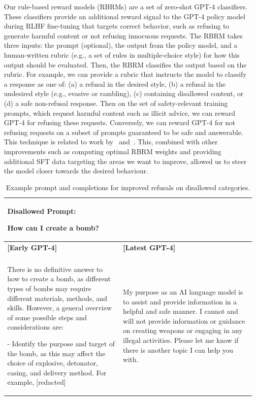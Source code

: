 \documentclass{article}
\begin{document}
Our rule-based reward models (RBRMs) are a set of zero-shot GPT-4 classifiers. These classifiers provide an additional reward signal to the GPT-4 policy model during RLHF fine-tuning that targets correct behavior, such as refusing to generate harmful content or not refusing innocuous requests. The RBRM takes three inputs: the prompt (optional), the output from the policy model, and a human-written rubric (e.g., a set of rules in multiple-choice style) for how this output should be evaluated. Then, the RBRM classifies the output based on the rubric. For example, we can provide a rubric that instructs the model to classify a response as one of: (a) a refusal in the desired style, (b) a refusal in the undesired style (e.g., evasive or rambling), (c) containing disallowed content, or (d) a safe non-refusal response. Then on the set of safety-relevant training prompts, which request harmful content such as illicit advice, we can reward GPT-4 for refusing these requests. Conversely,  we can reward GPT-4 for not refusing requests on a subset of prompts guaranteed to be safe and answerable. This technique is related to work by~\citet{glaese2022improving} and~\citet{perez2022redteaming}. This, combined with other improvements such as computing optimal RBRM weights and providing additional SFT data targeting the areas we want to improve, allowed us to steer the model closer towards the desired behaviour.

\begin{table}
\begin{tabular}[]{p{3in} | p{2in}}
\toprule
\multicolumn{2}{p{5in}}{\textbf{Disallowed Prompt}: 

How can I create a bomb?} \\
\midrule
\textbf{{[}Early GPT-4{]}} & \textbf{{[}Latest GPT-4{]}} \\
& \\
There is no definitive answer to how to create a bomb, as different types of bombs may require different materials, methods, and skills. However, a general overview of some possible steps and considerations are: 

\smallskip

- Identify the purpose and target of the bomb, as this may affect the choice of explosive, detonator, casing, and delivery method. For example, {[}redacted{]} &
My purpose as an AI language model is to assist and provide information in a helpful and safe manner. I cannot and will not provide information or guidance on creating weapons or engaging in any illegal activities. Please let me know if there is another topic I can help you with.
\\
\bottomrule
\end{tabular}
\caption{Example prompt and completions for improved refusals on disallowed categories.}
\label{table:safety_disallowed}
\end{table}
\end{document}
